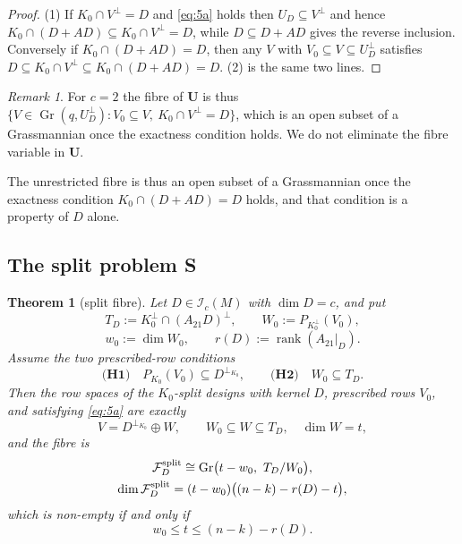 \documentclass[journal]{IEEEtran}
\theoremstyle{plainn}
\newtheorem{thm}{Theorem}
\theoremstyle{remark}
\newtheorem{remark}{Remark}
\newcommand{\rank}{\operatorname{rank}}
\newcommand{\Gr}{\operatorname{Gr}}
\begin{document}
\begin{proof}
(1) If $K_0\cap V^\perp=D$ and \eqref{eq:5a} holds then $U_D\subseteq V^\perp$ and hence
$K_0\cap(D+AD)\subseteq K_0\cap V^\perp=D$, while $D\subseteq D+AD$ gives the reverse inclusion.
Conversely if $K_0\cap(D+AD)=D$, then any $V$ with $V_0\subseteq V\subseteq U_D^\perp$ satisfies
$D\subseteq K_0\cap V^\perp\subseteq K_0\cap(D+AD)=D$. (2) is the same two lines.
\end{proof}

\begin{remark}\label{rem:ufibre}
For $c=2$ the fibre of \textbf{U} is thus
$\{V\in\Gr(q,U_D^\perp):V_0\subseteq V,\ K_0\cap V^\perp=D\}$, which is an open subset of a Grassmannian
once the exactness condition holds. We do not eliminate the fibre variable in \textbf{U}.
\end{remark}

The unrestricted fibre is thus an open subset of a Grassmannian once the exactness condition
$K_0\cap(D+AD)=D$ holds, and that condition is a property of $D$ alone.

\subsection{The split problem \texorpdfstring{\textbf{S}}{S}}\label{sec:fibres:s}

\begin{thm}[split fibre]\label{thm:splitfibre}
Let $D\in\mathcal I_c(M)$ with $\dim D=c$, and put
\[
T_D:=K_0^\perp\cap(A_{21}D)^\perp,\qquad W_0:=P_{K_0^\perp}(V_0),
\]
\[
w_0:=\dim W_0,\qquad r(D):=\rank(A_{21}|_D).
\]
Assume the two prescribed-row conditions
\begin{equation}\label{eq:splithyp}
\textbf{(H1)}\quad P_{K_0}(V_0)\subseteq D^{\perp_{K_0}},
\qquad
\textbf{(H2)}\quad W_0\subseteq T_D .
\end{equation}
Then the row spaces of the $K_0$-split designs with kernel $D$, prescribed rows $V_0$, and satisfying
\eqref{eq:5a} are exactly
\[
V=D^{\perp_{K_0}}\oplus W,\qquad W_0\subseteq W\subseteq T_D,\quad \dim W=t,
\]
and the fibre is
\begin{equation}\label{eq:splitfibre}
\begin{gathered}
\mathcal F_D^{\rm split}\cong\Gr\bigl(t-w_0,\ T_D/W_0\bigr),\\
\dim\mathcal F_D^{\rm split}=(t-w_0)\bigl((n-k)-r(D)-t\bigr),
\end{gathered}
\end{equation}
which is non-empty if and only if
\[
w_0\le t\le (n-k)-r(D).
\]
\end{thm}
\end{document}
